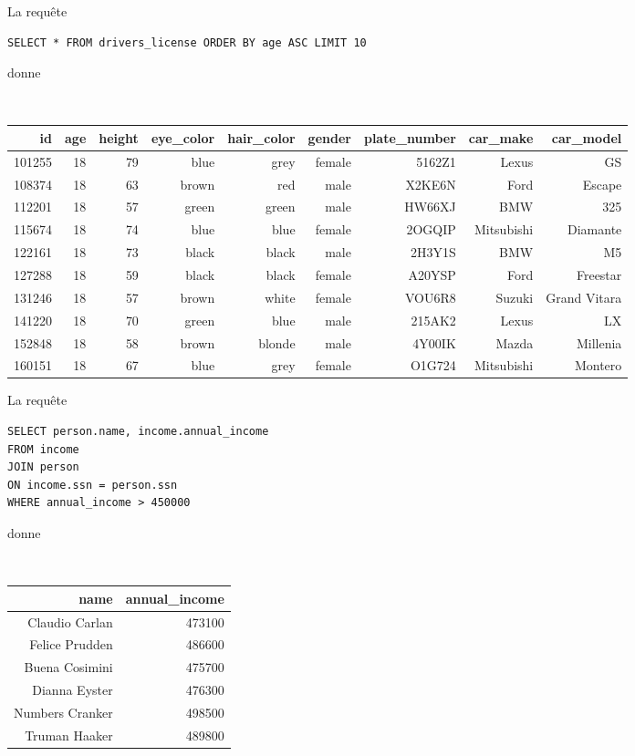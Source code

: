 La requête
\begin{verbatim}
SELECT * FROM drivers_license ORDER BY age ASC LIMIT 10
\end{verbatim}
donne
\begin{table}[!htp]
\centering
{\tt
\begin{tabular}{rrrrrrrrr}
 id  &  age  &  height  &  eye\_color  &  hair\_color  &  gender  &  plate\_number  &  car\_make  &  car\_model  \\ \hline
 101255  &  18  &  79  &  blue  &  grey  &  female  &  5162Z1  &  Lexus  &  GS  \\
 108374  &  18  &  63  &  brown  &  red  &  male  &  X2KE6N  &  Ford  &  Escape  \\
 112201  &  18  &  57  &  green  &  green  &  male  &  HW66XJ  &  BMW  &  325 \\
 115674  &  18  &  74  &  blue  &  blue  &  female  &  2OGQIP  &  Mitsubishi  &  Diamante \\ 
 122161  &  18  &  73  &  black  &  black  &  male  &  2H3Y1S  &  BMW  &  M5  \\
 127288  &  18  &  59  &  black  &  black  &  female  &  A20YSP  &  Ford  &  Freestar \\ 
 131246  &  18  &  57  &  brown  &  white  &  female  &  VOU6R8  &  Suzuki  &  Grand Vitara \\ 
 141220  &  18  &  70  &  green  &  blue  &  male  &  215AK2  &  Lexus  &  LX \\
 152848  &  18  &  58  &  brown  &  blonde  &  male  &  4Y00IK  &  Mazda  &  Millenia \\ 
 160151  &  18  &  67  &  blue  &  grey  &  female  &  O1G724  &  Mitsubishi  &  Montero \\
\end{tabular}
}
\end{table}


\question{}
 
La requête
\begin{verbatim}
SELECT person.name, income.annual_income 
FROM income 
JOIN person 
ON income.ssn = person.ssn 
WHERE annual_income > 450000
\end{verbatim}
donne
\begin{table}[!htp]
\centering
{\tt
\begin{tabular}{rr}
name	& annual\_income \\ \hline
Claudio Carlan	& 473100 \\
Felice Prudden	& 486600 \\
Buena Cosimini	& 475700 \\
Dianna Eyster	& 476300 \\
Numbers Cranker	& 498500 \\
Truman Haaker	& 489800 \\
\end{tabular}
}
\end{table}





